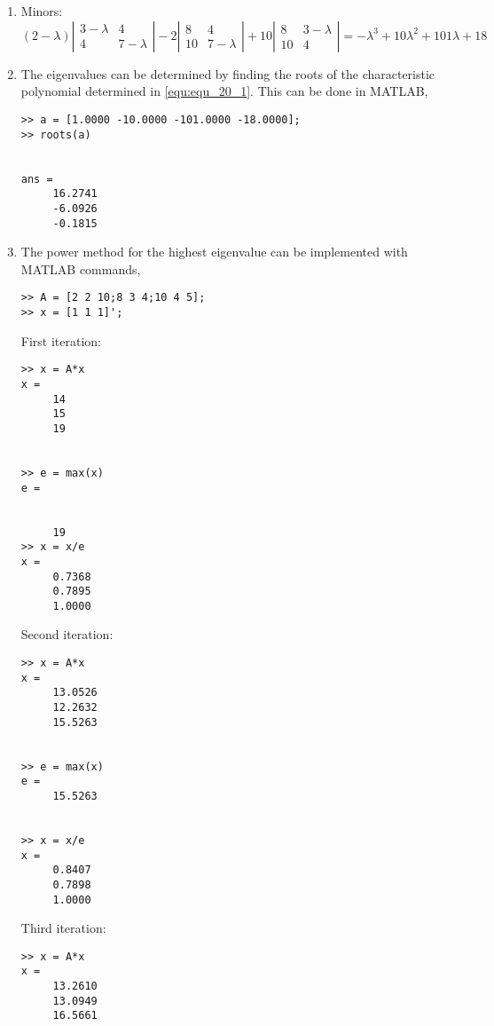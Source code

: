 \documentclass[../main.tex]{subfiles}
\begin{document}
\section{} \label{sec:sec_20_2}
\begin{enumerate}[label=\bfseries(\alph*)]
\item Minors:
	\bigbreak
$
(2-\lambda)\left|\begin{array}{cc}
3-\lambda & 4 \\
4 & 7-\lambda
\end{array}\right|-2\left|\begin{array}{cc}
8 & 4 \\
10 & 7-\lambda
\end{array}\right|+10\left|\begin{array}{cc}
8 & 3-\lambda \\
10 & 4
\end{array}\right|=-\lambda^{3}+10 \lambda^{2}+101 \lambda+18
$ \label{equ:equ_20_1}
	\bigbreak
\item The eigenvalues can be determined by finding the roots of the characteristic polynomial determined in \ref{equ:equ_20_1}. This can be done in MATLAB,
	\bigbreak
\begin{lstlisting}[numbers=none]
>> a = [1.0000 -10.0000 -101.0000 -18.0000];
>> roots(a)


ans =
	 16.2741
	 -6.0926
	 -0.1815
\end{lstlisting}
	\bigbreak
\item 
	\bigbreak
The power method for the highest eigenvalue can be implemented with MATLAB commands,
	\bigbreak
\begin{lstlisting}[numbers=none]
>> A = [2 2 10;8 3 4;10 4 5];
>> x = [1 1 1]'; 
\end{lstlisting}
	\bigbreak
First iteration:
	\bigbreak
\begin{lstlisting}[numbers=none]
>> x = A*x
x =
	 14
	 15
	 19


>> e = max(x)
e =


	 19
>> x = x/e
x =
	 0.7368
	 0.7895
	 1.0000
\end{lstlisting}
	\bigbreak
Second iteration:
	\bigbreak
\begin{lstlisting}[numbers=none]
>> x = A*x
x =
	 13.0526
	 12.2632
	 15.5263


>> e = max(x)
e =
	 15.5263


>> x = x/e
x =
	 0.8407
	 0.7898
	 1.0000 
\end{lstlisting}
	\bigbreak
Third iteration:
	\bigbreak
\begin{lstlisting}[numbers=none]
>> x = A*x
x =
	 13.2610
	 13.0949
	 16.5661



\end{lstlisting}
\end{enumerate}
\end{document}
